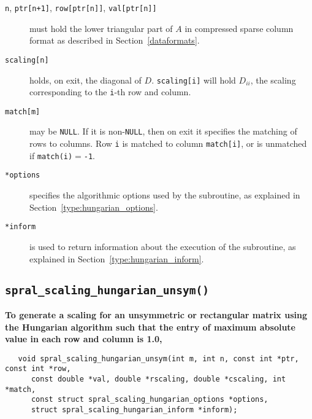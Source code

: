 \begin{description}

\item[\texttt{n}, \texttt{ptr[n+1]}, \texttt{row[ptr[n]]}, \texttt{val[ptr[n]]}] must hold the lower triangular part of $A$ in compressed sparse column format as described in Section~\ref{dataformats}.

\item[\texttt{scaling[n]}] holds, on exit, the diagonal of $D$.
\texttt{scaling[i]} will hold $D_{ii}$, the scaling corresponding to the
\texttt{i}-th row and column.

\item[\texttt{match[m]}] may be \texttt{NULL}. If it is non-\texttt{NULL},
then on exit it specifies the matching of rows to columns.
Row \texttt{i} is matched to column \texttt{match[i]}, or is unmatched
if \texttt{match(i)}$=$\texttt{-1}.

\item[\texttt{*options}] specifies the algorithmic options used by the subroutine, as explained in Section~\ref{type:hungarian_options}.

\item[\texttt{*inform}] is used to return information about the execution of the subroutine, as explained in Section~\ref{type:hungarian_inform}.


\end{description}

\subsection{\texttt{spral\_scaling\_hungarian\_unsym()}}

\textbf{\noindent
   To generate a scaling for an unsymmetric or rectangular matrix using the Hungarian algorithm such that the entry of maximum absolute value in each row and column is 1.0,
}
\vspace*{-0.1cm}
\begin{verbatim}
   void spral_scaling_hungarian_unsym(int m, int n, const int *ptr, const int *row,
      const double *val, double *rscaling, double *cscaling, int *match,
      const struct spral_scaling_hungarian_options *options,
      struct spral_scaling_hungarian_inform *inform);
\end{verbatim}

